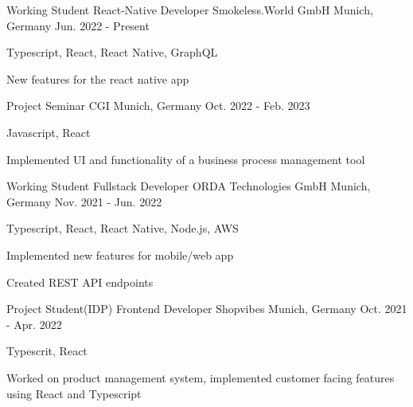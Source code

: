 

\begin{cventries}

  \cventry
  {Working Student React-Native Developer} %
  {Smokeless.World GmbH} %
  {Munich, Germany} %
  {Jun. 2022 - Present} %
  {
    \begin{cvitems} %
      \item {Typescript, React, React Native, GraphQL}
      \item {New features for the react native app}
    \end{cvitems}
  }



  \cventry
  {Project Seminar} %
  {CGI} %
  {Munich, Germany} %
  {Oct. 2022 - Feb. 2023} %
  {
    \begin{cvitems} %
      \item {Javascript, React}
      \item {Implemented UI and functionality of a business process management tool}
    \end{cvitems}
  }



  \cventry
  {Working Student Fullstack Developer} %
  {ORDA Technologies GmbH} %
  {Munich, Germany} %
  {Nov. 2021 - Jun. 2022} %
  {
    \begin{cvitems} %
      \item {Typescript, React, React Native, Node.js, AWS}
      \item {Implemented new features for mobile/web app}
      \item {Created REST API endpoints}
    \end{cvitems}
  }



  \cventry
  {Project Student(IDP) Frontend Developer} %
  {Shopvibes} %
  {Munich, Germany} %
  {Oct. 2021 - Apr. 2022} %
  {
    \begin{cvitems} %
      \item {Typescrit, React}
      \item {Worked on product management system, implemented customer facing features using React and Typescript}
    \end{cvitems}
  }
\end{cventries}
